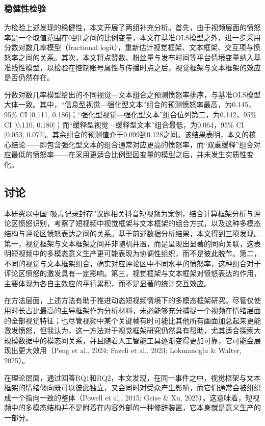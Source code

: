 \documentclass[
]{article}
\begin{document}
\subsubsection{稳健性检验}\label{ux7a33ux5065ux6027ux68c0ux9a8c}

为检验上述发现的稳健性，本文开展了两组补充分析。首先，由于视频层面的愤怒率是一个取值范围在0到1之间的比例变量，本文在基准OLS模型之外，进一步采用分数对数几率模型（fractional
logit），重新估计视觉框架、文本框架、交互项与愤怒率之间的关系。其次，本文将点赞数、粉丝量与发布时间等平台情境变量纳入基准线性模型，以检验在控制账号属性与传播时点之后，视觉框架与文本框架的效应是否仍然存在。

分数对数几率模型给出的不同视觉---文本组合之预测愤怒率排序，与基准OLS模型大体一致。其中，``信息型视觉---强化型文本''组合的预测愤怒率最高，为0.145，95\%
CI {[}0.111,
0.186{]}；``强化型视觉---强化型文本''组合位列第二，为0.142，95\% CI
{[}0.110, 0.180{]}；而``缓释型视觉---缓释型文本''组合最低，为0.064，95\%
CI {[}0.053,
0.077{]}。其余组合的预测值介于0.099到0.128之间。该结果表明，本文的核心结论------即包含强化型文本的组合通常对应更高的愤怒率，而``双重缓释''组合对应最低的愤怒率------在采用更适合比例型因变量的模型之后，并未发生实质性变化。

\subsection{讨论}\label{ux8ba8ux8bba}

本研究以中国``吸毒记录封存''议题相关抖音短视频为案例，结合计算框架分析与评论区愤怒识别，考察了短视频中视觉框架与文本框架的组合方式，以及这种多模态结构与评论区愤怒表达之间的关系。基于前述数据分析结果，本文得到三项发现。第一，视觉框架与文本框架之间并非随机并置，而是呈现出显著的同向关联，这表明短视频中的多模态意义生产更可能表现为协调性组织，而不是彼此脱节。第二，不同的视觉与文本框架组合，确实对应评论区中不同水平的愤怒率，这种组合对于评论区愤怒的激发具有一定影响。第三，视觉框架与文本框架对愤怒表达的作用，主要体现为各自主效应的平行累积，而不是显著的统计交互效应。

在方法层面，上述方法有助于推进动态短视频情境下的多模态框架研究。尽管仅使用时长占比最高的主导框架作为分析材料，未必能够充分捕捉一个视频在情绪层面的全部视觉特征；也尽管视频中某个关键帧有时可能比其他所有画面加总起来更能激发愤怒，但我认为，这一方法对于视觉框架研究仍然具有帮助，尤其适合探索大规模数据中的模态间关系，并且随着人工智能工具逐渐变得更加可靠，它可能会展现出更大效用（Peng
et al., 2024; Fazeli et al., 2023; Lokmanoglu \& Walter, 2025）。

在理论层面，通过回答RQ1和RQ2，本文发现，在同一事件之中，视觉框架与文本框架的情绪倾向既可以彼此独立，又会同时对受众产生影响，而它们通常会被组织成一个指向一致的整体（Powell
et al., 2015; Geise \& Xu,
2025）。这意味着，短视频中的多模态结构并不是附着在内容外部的一种修辞装置，它本身就是意义生产的一部分。
\end{document}
